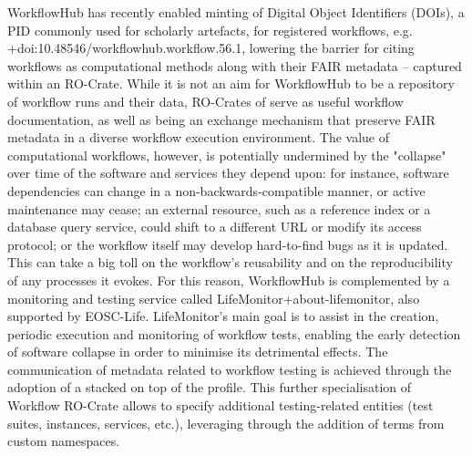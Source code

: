 {}WorkflowHub has recently enabled minting of Digital Object Identifiers (DOIs), a PID commonly used for scholarly artefacts, for registered workflows, e.g.  +{}{}{doi:10.48546/workflowhub.workflow.56.1}, lowering the barrier for citing workflows as computational methods along with their FAIR metadata – captured within an RO-Crate. While it is not an aim for WorkflowHub to be a repository of workflow runs and their data, RO-Crates of  serve as useful workflow documentation, as well as being an exchange mechanism that preserve FAIR metadata in a diverse workflow execution environment.\markdownRendererInterblockSeparator
{}\markdownRendererInterblockSeparator
{}The value of computational workflows, however, is potentially undermined by the "collapse" over time of the software and services they depend upon: for instance, software dependencies can change in a non-backwards-compatible manner, or active maintenance may cease; an external resource, such as a reference index or a database query service, could shift to a different URL or modify its access protocol; or the workflow itself may develop hard-to-find bugs as it is updated. This can take a big toll on the workflow's reusability and on the reproducibility of any processes it evokes.\markdownRendererInterblockSeparator
{}For this reason, WorkflowHub is complemented by a monitoring and testing service called LifeMonitor+{}{}{about-lifemonitor}, also supported by EOSC-Life. LifeMonitor's main goal is to assist in the creation, periodic execution and monitoring of workflow tests, enabling the early detection of software collapse in order to minimise its detrimental effects. The communication of metadata related to workflow testing is achieved through the adoption of a  stacked on top of the  profile. This further specialisation of Workflow RO-Crate allows to specify additional testing-related entities (test suites, instances, services, etc.), leveraging  through the addition of terms from custom namespaces.\markdownRendererInterblockSeparator

